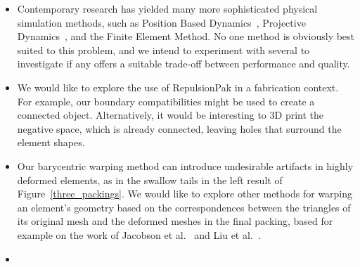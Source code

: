 \begin{itemize}
\item 
{}
	Contemporary research has yielded many more sophisticated 
	physical simulation methods, such as Position Based Dynamics~\cite{Muller2007}, 
	Projective Dynamics~\cite{Bouaziz2014}, and the Finite Element Method.
	No one method is obviously best suited to this problem, and
	we intend to experiment with several to investigate if any offers
	a suitable trade-off between performance and quality.

\item {} 
We would like to explore the use of RepulsionPak in a fabrication context.
      For example, our boundary compatibilities might be used to create a connected object.
      Alternatively, it would be interesting to 3D print the 
      negative space, which is already connected,
	  leaving holes that surround the element shapes.

\item {}
Our barycentric warping method can
	introduce undesirable artifacts in highly deformed elements, as
	in the swallow tails in the left result of Figure~\ref{three_packings}.
	We would like to explore other methods for warping an element's
	geometry based on the correspondences between the triangles of its original
	mesh and the deformed meshes in the final packing, based for example on the
	work of Jacobson et al.~\cite{Jacobson2011} and Liu et al.~\cite{Liu2014}.


\item {}

\end{itemize}

